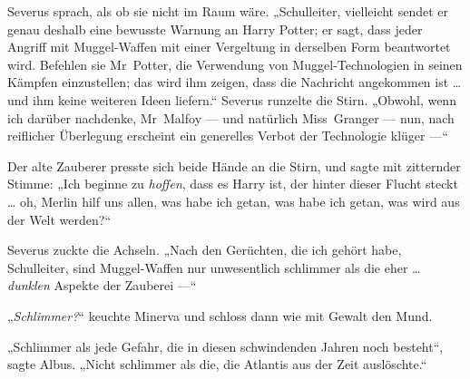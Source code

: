 Severus sprach, als ob sie nicht im Raum wäre.
„Schulleiter, vielleicht sendet er genau deshalb eine bewusste Warnung an Harry Potter; er sagt, dass jeder Angriff mit Muggel-Waffen mit einer Vergeltung in derselben Form beantwortet wird. Befehlen sie Mr~Potter, die Verwendung von Muggel-Technologien in seinen Kämpfen einzustellen; das wird ihm zeigen, dass die Nachricht angekommen ist … und ihm keine weiteren Ideen liefern.“ Severus runzelte die Stirn.
„Obwohl, wenn ich darüber nachdenke, Mr~Malfoy — und natürlich Miss~Granger — nun, nach reiflicher Überlegung erscheint ein generelles Verbot der Technologie klüger —“

Der alte Zauberer presste sich beide Hände an die Stirn, und sagte mit zitternder Stimme:
„Ich beginne zu \emph{hoffen}, dass es Harry ist, der hinter dieser Flucht steckt … oh, Merlin hilf uns allen, was habe ich getan, was habe ich getan, was wird aus der Welt werden?“

Severus zuckte die Achseln.
„Nach den Gerüchten, die ich gehört habe, Schulleiter, sind Muggel-Waffen nur unwesentlich schlimmer als die eher … \emph{dunklen} Aspekte der Zauberei —“

„\emph{Schlimmer?}“ keuchte Minerva und schloss dann wie mit Gewalt den Mund.

„Schlimmer als jede Gefahr, die in diesen schwindenden Jahren noch besteht“, sagte Albus.
„Nicht schlimmer als die, die Atlantis aus der Zeit auslöschte.“

